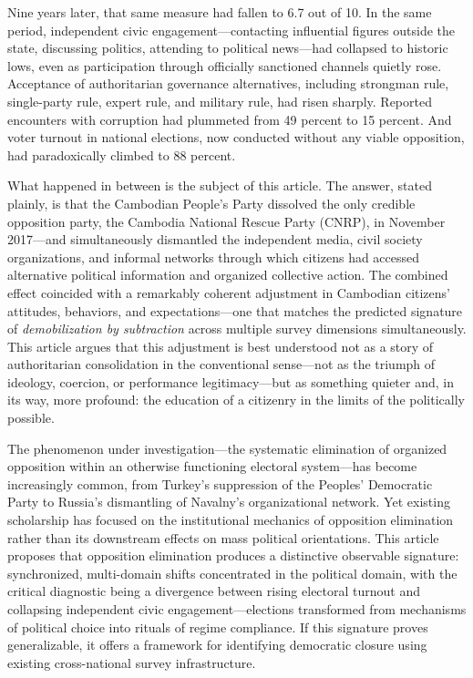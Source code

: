 \documentclass[
  12pt,
  letterpaper]{article}
\begin{document}
Nine years later, that same measure had fallen to 6.7 out of 10. In the
same period, independent civic engagement---contacting influential
figures outside the state, discussing politics, attending to political
news---had collapsed to historic lows, even as participation through
officially sanctioned channels quietly rose. Acceptance of authoritarian
governance alternatives, including strongman rule, single-party rule,
expert rule, and military rule, had risen sharply. Reported encounters
with corruption had plummeted from 49 percent to 15 percent. And voter
turnout in national elections, now conducted without any viable
opposition, had paradoxically climbed to 88 percent.

What happened in between is the subject of this article. The answer,
stated plainly, is that the Cambodian People's Party dissolved the only
credible opposition party, the Cambodia National Rescue Party (CNRP), in
November 2017---and simultaneously dismantled the independent media,
civil society organizations, and informal networks through which
citizens had accessed alternative political information and organized
collective action. The combined effect coincided with a remarkably
coherent adjustment in Cambodian citizens' attitudes, behaviors, and
expectations---one that matches the predicted signature of
\emph{demobilization by subtraction} across multiple survey dimensions
simultaneously. This article argues that this adjustment is best
understood not as a story of authoritarian consolidation in the
conventional sense---not as the triumph of ideology, coercion, or
performance legitimacy---but as something quieter and, in its way, more
profound: the education of a citizenry in the limits of the politically
possible.

The phenomenon under investigation---the systematic elimination of
organized opposition within an otherwise functioning electoral
system---has become increasingly common, from Turkey's suppression of
the Peoples' Democratic Party to Russia's dismantling of Navalny's
organizational network. Yet existing scholarship has focused on the
institutional mechanics of opposition elimination rather than its
downstream effects on mass political orientations. This article proposes
that opposition elimination produces a distinctive observable signature:
synchronized, multi-domain shifts concentrated in the political domain,
with the critical diagnostic being a divergence between rising electoral
turnout and collapsing independent civic engagement---elections
transformed from mechanisms of political choice into rituals of regime
compliance. If this signature proves generalizable, it offers a
framework for identifying democratic closure using existing
cross-national survey infrastructure.
\end{document}
